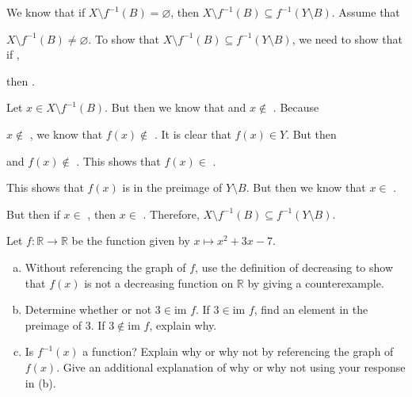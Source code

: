\documentclass[11pt,letterpaper]{article}
\begin{document}
 We know that if $X \setminus f^{-1}(B)= \varnothing$, then $X \setminus f^{-1}(B) \subseteq f^{-1}(Y \setminus B)$. Assume that \pspace

$X \setminus f^{-1}(B)\neq \varnothing$. To show that $X \setminus f^{-1}(B) \subseteq f^{-1}(Y \setminus B)$, we need to show that if \underline{\hspace{3cm}}, \pspace

then \underline{\hspace{3cm}}. \pspace

Let $x \in X \setminus f^{-1}(B)$. But then we know that \underline{\hspace{3cm}} and $x \notin$ \underline{\hspace{3cm}}. Because \pspace

$x \notin$ \underline{\hspace{3cm}}, we know that $f(x) \notin$ \underline{\hspace{3cm}}. It is clear that $f(x) \in Y$. But then \pspace

\underline{\hspace{3cm}} and $f(x) \notin$ \underline{\hspace{3cm}}. This shows that $f(x) \in$ \underline{\hspace{3cm}}. \pspace

This shows that $f(x)$ is in the preimage of $Y \setminus B$. But then we know that $x \in$ \underline{\hspace{3cm}}. \pspace

But then if $x \in$ \underline{\hspace{3cm}}, then $x \in$ \underline{\hspace{3cm}}. Therefore, $X \setminus f^{-1}(B) \subseteq f^{-1}(Y \setminus B)$.



\newpage



 Let $f: \mathbb{R} \to \mathbb{R}$ be the function given by $x \mapsto x^2 + 3x - 7$. 
	\begin{enumerate}[(a)]
	\item Without referencing the graph of $f$, use the definition of decreasing to show that $f(x)$ is not a decreasing function on $\mathbb{R}$ by giving a counterexample. 
	\item Determine whether or not $3 \in \text{im } f$. If $3 \in \text{im } f$, find an element in the preimage of 3. If $3 \notin \text{im } f$, explain why. 
	\item Is $f^{-1}(x)$ a function? Explain why or why not by referencing the graph of $f(x)$. Give an additional explanation of why or why not using your response in (b). 
	\end{enumerate}
\end{document}

